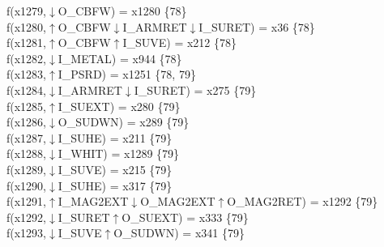 f(x1279,$\downarrow$O\_CBFW) = x1280 \{78\} \\  
f(x1280,$\uparrow$O\_CBFW$\downarrow$I\_ARMRET$\downarrow$I\_SURET) = x36 \{78\} \\  
f(x1281,$\uparrow$O\_CBFW$\uparrow$I\_SUVE) = x212 \{78\} \\  
f(x1282,$\downarrow$I\_METAL) = x944 \{78\} \\  
f(x1283,$\uparrow$I\_PSRD) = x1251 \{78, 79\} \\  
f(x1284,$\downarrow$I\_ARMRET$\downarrow$I\_SURET) = x275 \{79\} \\  
f(x1285,$\uparrow$I\_SUEXT) = x280 \{79\} \\  
f(x1286,$\downarrow$O\_SUDWN) = x289 \{79\} \\  
f(x1287,$\downarrow$I\_SUHE) = x211 \{79\} \\  
f(x1288,$\downarrow$I\_WHIT) = x1289 \{79\} \\  
f(x1289,$\downarrow$I\_SUVE) = x215 \{79\} \\  
f(x1290,$\downarrow$I\_SUHE) = x317 \{79\} \\  
f(x1291,$\uparrow$I\_MAG2EXT$\downarrow$O\_MAG2EXT$\uparrow$O\_MAG2RET) = x1292 \{79\} \\  
f(x1292,$\downarrow$I\_SURET$\uparrow$O\_SUEXT) = x333 \{79\} \\  
f(x1293,$\downarrow$I\_SUVE$\uparrow$O\_SUDWN) = x341 \{79\} \\  
